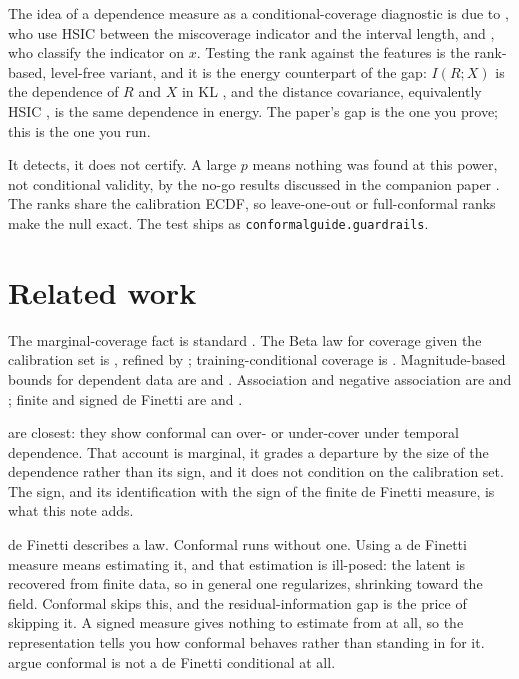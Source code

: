 \documentclass[11pt]{article}
\begin{document}
The idea of a dependence measure as a conditional-coverage diagnostic is due to
\citet{feldman2021}, who use HSIC between the miscoverage indicator and the interval length, and
\citet{braun2025}, who classify the indicator on $x$. Testing the rank against the features is
the rank-based, level-free variant, and it is the energy counterpart of the gap: $I(R;X)$ is the
dependence of $R$ and $X$ in KL \citep{cover2006}, and the distance covariance, equivalently
HSIC \citep{sejdinovic2013}, is the same dependence in energy. The paper's gap is the one you
prove; this is the one you run.

It detects, it does not certify. A large $p$ means nothing was found at this power, not
conditional validity, by the no-go results discussed in the companion paper
\citep{cotton_marginally}. The ranks share the calibration ECDF, so leave-one-out or
full-conformal ranks make the null exact. The test ships as \texttt{conformalguide.guardrails}.

\section{Related work}

The marginal-coverage fact is standard \citep{vovk2005}. The Beta law for coverage given the
calibration set is \citet{vovk2012}, refined by \citet{marques2024}; training-conditional
coverage is \citet{bian2023}. Magnitude-based bounds for dependent data are
\citet{barber2023beyond} and \citet{oliveira2024}. Association and negative association are
\citet{esary1967} and \citet{joagdev1983}; finite and signed de Finetti are
\citet{diaconis1980} and \citet{kerns2006,leonetti2018}.

\citet{barberpananjady2026} are closest: they show conformal can over- or under-cover under
temporal dependence. That account is marginal, it grades a departure by the size of the
dependence rather than its sign, and it does not condition on the calibration set. The sign,
and its identification with the sign of the finite de Finetti measure, is what this note adds.

de Finetti describes a law. Conformal runs without one. Using a de Finetti measure means
estimating it, and that estimation is ill-posed: the latent is recovered from finite data, so in
general one regularizes, shrinking toward the field. Conformal skips this, and the
residual-information gap is the price of skipping it. A signed measure gives nothing to estimate
from at all, so the representation tells you how conformal behaves rather than standing in for
it. \citet{datta2025} argue conformal is not a de Finetti conditional at all.



\end{document}
